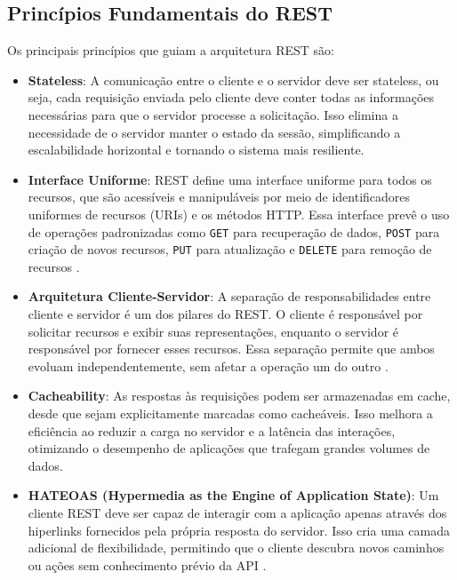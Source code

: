 \documentclass[12pt]{article}
\begin{document}
	\subsection{Princípios Fundamentais do REST}
	
	Os principais princípios que guiam a arquitetura REST são:
	
	\begin{itemize}
		\item \textbf{Stateless}: A comunicação entre o cliente e o servidor deve ser stateless, ou seja, cada requisição enviada pelo cliente deve conter todas as informações necessárias para que o servidor processe a solicitação. Isso elimina a necessidade de o servidor manter o estado da sessão, simplificando a escalabilidade horizontal e tornando o sistema mais resiliente.
		
		\item \textbf{Interface Uniforme}: REST define uma interface uniforme para todos os recursos, que são acessíveis e manipuláveis por meio de identificadores uniformes de recursos (URIs) e os métodos HTTP. Essa interface prevê o uso de operações padronizadas como \texttt{GET} para recuperação de dados, \texttt{POST} para criação de novos recursos, \texttt{PUT} para atualização e \texttt{DELETE} para remoção de recursos \cite{fielding2000}.
		
		\item \textbf{Arquitetura Cliente-Servidor}: A separação de responsabilidades entre cliente e servidor é um dos pilares do REST. O cliente é responsável por solicitar recursos e exibir suas representações, enquanto o servidor é responsável por fornecer esses recursos. Essa separação permite que ambos evoluam independentemente, sem afetar a operação um do outro \cite{cavaleiro2013}.
		
		\item \textbf{Cacheability}: As respostas às requisições podem ser armazenadas em cache, desde que sejam explicitamente marcadas como cacheáveis. Isso melhora a eficiência ao reduzir a carga no servidor e a latência das interações, otimizando o desempenho de aplicações que trafegam grandes volumes de dados.
		
		\item \textbf{HATEOAS (Hypermedia as the Engine of Application State)}: Um cliente REST deve ser capaz de interagir com a aplicação apenas através dos hiperlinks fornecidos pela própria resposta do servidor. Isso cria uma camada adicional de flexibilidade, permitindo que o cliente descubra novos caminhos ou ações sem conhecimento prévio da API \cite{fielding2000}.
	\end{itemize}
	
\end{document}
